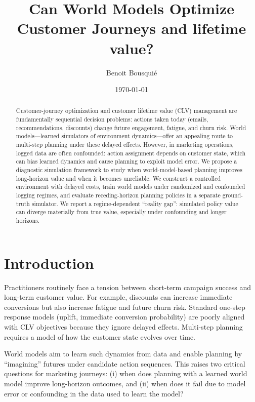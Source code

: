 \documentclass[11pt]{article}
\title{Can World Models Optimize Customer Journeys and lifetime value?}
\author{Benoit Bousqui\'e}
\date{\today}
\begin{document}
\maketitle

\begin{abstract}
Customer-journey optimization and customer lifetime value (CLV) management are fundamentally sequential decision problems: actions taken today (emails, recommendations, discounts) change future engagement, fatigue, and churn risk. World models---learned simulators of environment dynamics---offer an appealing route to multi-step planning under these delayed effects. However, in marketing operations, logged data are often confounded: action assignment depends on customer state, which can bias learned dynamics and cause planning to exploit model error.
We propose a diagnostic simulation framework to study when world-model-based planning improves long-horizon value and when it becomes unreliable. We construct a controlled environment with delayed costs, train world models under randomized and confounded logging regimes, and evaluate receding-horizon planning policies in a separate ground-truth simulator. We report a regime-dependent ``reality gap'': simulated policy value can diverge materially from true value, especially under confounding and longer horizons.
\end{abstract}

\section{Introduction}
Practitioners routinely face a tension between short-term campaign success and long-term customer value. For example, discounts can increase immediate conversions but also increase fatigue and future churn risk. Standard one-step response models (uplift, immediate conversion probability) are poorly aligned with CLV objectives because they ignore delayed effects. Multi-step planning requires a model of how the customer state evolves over time.

World models aim to learn such dynamics from data and enable planning by ``imagining'' futures under candidate action sequences. This raises two critical questions for marketing journeys: (i) when does planning with a learned world model improve long-horizon outcomes, and (ii) when does it fail due to model error or confounding in the data used to learn the model?
\end{document}
